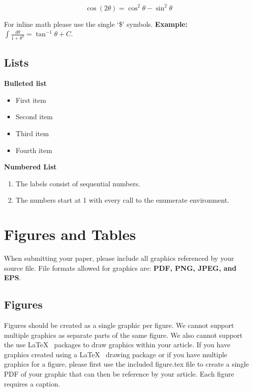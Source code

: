 \documentclass[hasAbstract,authorBox]{csmagazine}
\begin{document}
\begin{equation*}
\cos (2\theta) = \cos^2 \theta - \sin^2 \theta
\end{equation*}


For inline math please use the single `\$' symbols. \textbf{Example:} $\int\frac{d\theta} {1+\theta^2}=\tan^{-1} \theta+C$.

\pagebreak

\subsection{Lists}

\textbf{Bulleted list}

\begin{itemize}
	\itemsep0em 
	\item First item
	\item Second item
	\item Third item
	\item Fourth item
\end{itemize}

\textbf{Numbered List}

\begin{enumerate}
	\item The labels consist of sequential numbers.
	\item The numbers start at 1 with every call to the enumerate environment.
\end{enumerate}




\section{Figures and Tables}

When submitting your paper, please include all graphics referenced by your source file. File formats allowed for graphics are: \textbf{PDF, PNG, JPEG, and EPS}.

\subsection{Figures}

Figures should be created as a single graphic per figure. We cannot support multiple graphics as separate parts of the same figure. We also cannot support the use \LaTeX~ packages to draw graphics within your article. If you have graphics created using a \LaTeX~ drawing package or if you have multiple graphics for a figure, please first use the included figure.tex file to create a single PDF of your graphic that can then be reference by your article. Each figure requires a caption. 
\end{document}
